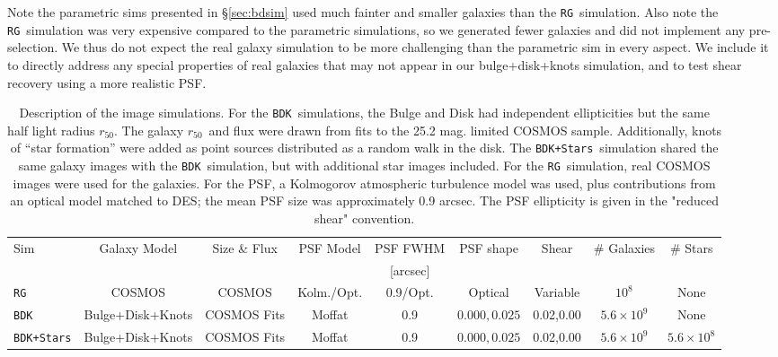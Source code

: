 \documentclass[a4paper,fleqn,usenatbib]{mnras}
\newcommand{\hlr}{$r_{50}$}
\newcommand{\nsimShear}{0.02,0.00}
\newcommand{\nsimNgal}{$10^8$}
\newcommand{\nsimNgalBD}{$5.6 \times 10^9$}
\newcommand{\nsimNStar}{$5.6 \times 10^8$}
\newcommand{\nsimPSFShape}{$0.000,0.025$}
\newcommand{\psfrdist}{0.9}
\newcommand{\galrdist}{COSMOS Fits}
\newcommand{\cosmosname}{COSMOS}
\newcommand{\bdsim}{\texttt{BDK}}
\newcommand{\bdstar}{\texttt{BDK+Stars}}
\newcommand{\rgsim}{\texttt{RG}}
\begin{document}
Note the parametric sims presented in \S \ref{sec:bdsim} used much fainter and
smaller galaxies than the \rgsim\ simulation.  Also note the \rgsim\ simulation
was very expensive compared to the parametric simulations, so we generated
fewer galaxies and did not implement any pre-selection.  We thus do not expect
the real galaxy simulation to be more challenging than the parametric sim in
every aspect. We include it to directly address any special properties of real
galaxies that may not appear in our bulge+disk+knots simulation, and to test
shear recovery using a more realistic PSF.  



\begin{table}
    \centering

    \caption{Description of the image simulations.  For the \bdsim\
    simulations, the Bulge and Disk had independent ellipticities but the same
    half light radius \hlr.  The galaxy \hlr\ and flux were drawn from fits to the 25.2 mag.
    limited COSMOS sample.  Additionally, knots of ``star formation'' were added as
    point sources distributed as a random walk in the disk.  The \bdstar\
    simulation shared the same galaxy images with the \bdsim\ simulation, but
    with additional star images included.  For
    the \rgsim\ simulation, real COSMOS images were used for the galaxies. For
    the PSF, a  Kolmogorov atmospheric turbulence model was used, 
    plus contributions from an optical model matched to DES; the mean PSF size
    was approximately 0.9 arcsec. The PSF ellipticity is given in the "reduced
    shear" convention.
    \label{tab:sims}}

    \begin{tabular}{ | l | c | c | c | c | c | c | c | c | }
        Sim          & Galaxy Model      & Size \& Flux   & PSF Model   & PSF FWHM        & PSF shape     & Shear & \# Galaxies    & \# Stars     \\
                     &                   &             &             & [arcsec]        &               &       &               &              \\
        \hline
        \rgsim       & \cosmosname       & \cosmosname & Kolm./Opt.  & \psfrdist/Opt.  & Optical       &  Variable & \nsimNgal     & None            \\
        \bdsim       & Bulge+Disk+Knots  & \galrdist   & Moffat      & \psfrdist       & \nsimPSFShape &  \nsimShear & \nsimNgalBD & None            \\
        \bdstar      & Bulge+Disk+Knots  & \galrdist   & Moffat      & \psfrdist       & \nsimPSFShape &  \nsimShear & \nsimNgalBD & \nsimNStar       \\
    \end{tabular}
\end{table}
\end{document}
